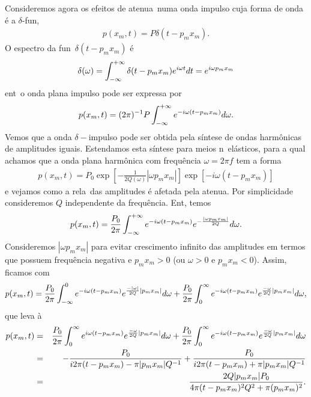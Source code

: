 Consideremos agora os efeitos de atenua\cao\ numa onda impulso cuja
forma de onda \'e a $\delta$-fun\cao,
\begin{eqnarray}
p(x_m,t) = P\delta(t - p_m x_m).
\end{eqnarray}
O espectro da fun\cao\ $\delta(t - p_m x_m)$ \'e
\begin{eqnarray}
\delta(\omega) = \int_{-\infty}^{+\infty}\delta(t - p_m x_m)e^{i\omega t}dt = e^{i\omega p_m x_m}
\end{eqnarray}
ent\ao\ o onda plana impulso pode ser expressa por
\begin{eqnarray}
p(x_m,t) = (2\pi)^{-1}P\int_{-\infty}^{+\infty} e^{-i\omega(t-p_m x_m)}d\omega.
\end{eqnarray}
Vemos que a onda $\delta-$impulso pode ser obtida pela s\'intese de
ondas harm\^onicas de amplitudes iguais. Estendamos esta s\'intese para
meios n\ao\ el\'asticos, para a qual achamos que a onda plana
harm\^onica com frequ\^encia $\omega = 2\pi f$ tem a forma
\begin{eqnarray}
p(x_m,t) = P_0\exp\left[-\frac{1}{2Q(\omega)}|\omega p_m x_m| \right]\exp[-i\omega(t-p_m x_m)]
\end{eqnarray}
e vejamos como a rela\cao\ das amplitudes \'e afetada pela atenua\cao.
Por simplicidade consideremos $Q$ independente da frequ\^encia. Ent\ao,
temos
\begin{eqnarray}
p(x_m,t) = \frac{P_0}{2\pi}\int_{-\infty}^{+\infty} e^{-i\omega(t-p_m x_m)}e^{-\frac{|\omega p_m x_m|}{2Q}}d\omega.
\end{eqnarray}
Consideremos $|\omega p_m x_m|$ para evitar crescimento infinito das
amplitudes em termos que possuem frequ\^encia negativa e $p_m x_m > 0$
(ou $\omega > 0$ e $p_m x_m < 0$). Assim, ficamos com
\begin{eqnarray}
p(x_m,t) = \frac{P_0}{2\pi}\int_{-\infty}^{0} e^{-i\omega(t-p_m x_m)}e^{\frac{-|\omega|}{2Q}|p_m x_m|}d\omega 
+ \frac{P_0}{2\pi}\int_{0}^{\infty} e^{-i\omega(t-p_m x_m)}e^{\frac{-\omega}{2Q}|p_m x_m|}d\omega,
\end{eqnarray}
que leva \`a
\begin{eqnarray}
p(x_m,t) &=& \frac{P_0}{2\pi}\int_{0}^{\infty} e^{i\omega(t-p_m x_m)}e^{\frac{-\omega}{2Q}|p_m x_m|}d\omega +
\frac{P_0}{2\pi}\int_{0}^{\infty} e^{-i\omega(t-p_m x_m)}e^{\frac{-\omega}{2Q}|p_m x_m|}d\omega \nonumber\\  
&=& -\frac{P_0}{i2\pi(t-p_m x_m) - \pi|p_m x_m|Q^{-1}} +
     \frac{P_0}{i2\pi(t-p_m x_m) + \pi|p_m x_m|Q^{-1}} \nonumber\\
&=& \frac{2Q|p_m x_m|P_0}{4\pi(t-p_m x_m)^2 Q^2 + \pi(p_m x_m)^2}.
\end{eqnarray}

